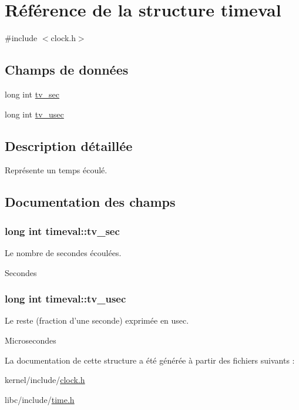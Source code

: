 \hypertarget{structtimeval}{\section{Référence de la structure timeval}
\label{structtimeval}
}


{\ttfamily \#include $<$clock.\-h$>$}

\subsection*{Champs de données}
\begin{DoxyCompactItemize}
\item 
long int \hyperlink{structtimeval_ab6fac84a084d017bb157f4681dafe8a3}{tv\-\_\-sec}
\item 
long int \hyperlink{structtimeval_a6f90a236deb00a89fe3dd8023d525d9c}{tv\-\_\-usec}
\end{DoxyCompactItemize}


\subsection{Description détaillée}
Représente un temps écoulé. 

\subsection{Documentation des champs}
\hypertarget{structtimeval_ab6fac84a084d017bb157f4681dafe8a3}{
\subsubsection[{tv\-\_\-sec}]{\setlength{\rightskip}{0pt plus 5cm}long int timeval\-::tv\-\_\-sec}}\label{structtimeval_ab6fac84a084d017bb157f4681dafe8a3}
Le nombre de secondes écoulées.

Secondes \hypertarget{structtimeval_a6f90a236deb00a89fe3dd8023d525d9c}{
\subsubsection[{tv\-\_\-usec}]{\setlength{\rightskip}{0pt plus 5cm}long int timeval\-::tv\-\_\-usec}}\label{structtimeval_a6f90a236deb00a89fe3dd8023d525d9c}
Le reste (fraction d'une seconde) exprimée en usec.

Microsecondes 

La documentation de cette structure a été générée à partir des fichiers suivants \-:\begin{DoxyCompactItemize}
\item 
kernel/include/\hyperlink{clock_8h}{clock.\-h}\item 
libc/include/\hyperlink{time_8h}{time.\-h}\end{DoxyCompactItemize}
